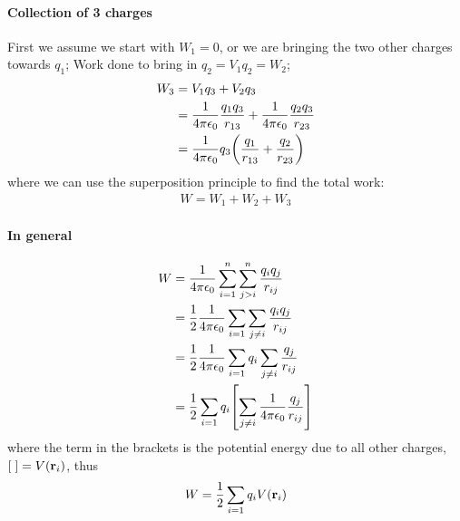 \documentclass[../main.tex]{subfiles}
\begin{document}
\paragraph*{Collection of 3 charges} First we assume we start with $W_1 = 0$,
or we are bringing the two other charges towards $q_1$; Work done to bring in $q_2 = V_1 q_2 = W_2$;
\begin{align*}
    W_3 &= V_1 q_3 + V_2 q_3 \\
    &= \ke \frac{q_1 q_3}{r_{13}} + \ke \frac{q_2 q_3}{r_{23}} \\
    &= \ke q_3 \qt(\frac{q_1}{r_{13}} + \frac{q_2}{r_{23}})
\end{align*}
where we can use the superposition principle to find the total work:
\begin{align*}
    W = W_1 + W_2 + W_3
\end{align*}

\paragraph*{In general}
\begin{align*}
    W &= \ke \sum_{i=1}^n \sum_{j>i}^n \frac{q_i q_j}{r_{ij}} \\
    &= \frac{1}{2} \ke \sum_{i=1} \sum_{j\neq i} \frac{q_i q_j}{r_{ij}} \\
    &= \frac{1}{2} \ke \sum_{i=1} q_i \sum_{j\neq i} \frac{q_j}{r_{ij}} \\
    &= \frac{1}{2} \sum_{i=1} q_i \qt[\sum_{j\neq i} \ke \frac{q_j}{r_{ij}}]
\end{align*}
where the term in the brackets is the potential energy due to all other charges, $[\;] = V(\vb r_i)$, thus
\begin{align*}
    W = \frac{1}{2} \sum_{i=1} q_i V(\vb r_i)
\end{align*}
\end{document}
